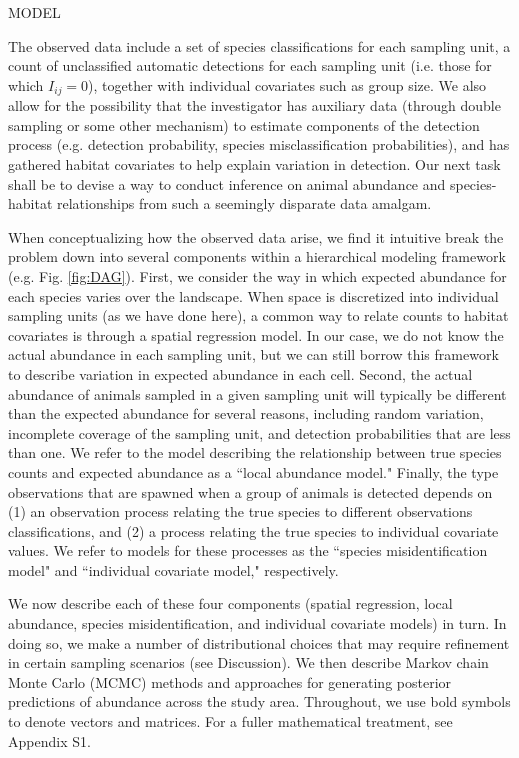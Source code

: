 \documentclass[12pt,fleqn]{article}
\begin{document}
\begin{flushleft}
\vspace{.15in}
MODEL \\
\vspace{.15in}

The observed data include a set of species classifications for each sampling unit, a count of unclassified automatic detections for each sampling unit (i.e. those for which $I_{ij}=0$), together with individual covariates such as group size. We also allow for the possibility that the investigator has auxiliary data (through double sampling or some other mechanism) to estimate components of the detection process (e.g. detection probability, species misclassification probabilities), and has gathered habitat covariates to help explain variation in detection.  Our next task shall be to devise a way to conduct inference on animal abundance and species-habitat relationships from such a seemingly disparate data amalgam.

\hspace{.5in} When conceptualizing how the observed data arise, we find it intuitive break the problem down into several components within a hierarchical modeling framework (e.g. Fig. \ref{fig:DAG}).  First, we consider the way in which expected abundance for each species varies over the landscape.  When space is discretized into individual sampling units (as we have done here), a common way to relate counts to habitat covariates is through a spatial regression model.  In our case, we do not know the actual abundance in each sampling unit, but we can still borrow this framework to describe variation in expected abundance in each cell.  Second, the actual abundance of animals sampled in a given sampling unit will typically be different than the expected abundance for several reasons, including random variation, incomplete coverage of the sampling unit, and detection probabilities that are less than one.  We refer to the model describing the relationship between true species counts and expected abundance as a ``local abundance model."  Finally, the type observations that are spawned when a group of animals is detected depends on (1) an observation process relating the true species to different observations classifications, and (2) a process relating the true species to individual covariate values.  We refer to models for these processes as the ``species misidentification model" and ``individual covariate model," respectively.

\hspace{.5in}We now describe each of these four components (spatial regression, local abundance, species misidentification, and individual covariate models) in turn.  In doing so, we make a number of distributional choices that may require refinement in certain sampling scenarios (see Discussion).  We then describe Markov chain Monte Carlo (MCMC) methods and approaches for generating posterior predictions of abundance across the study area.  Throughout, we use bold symbols to denote vectors and matrices.  For a fuller mathematical treatment, see Appendix S1.



\end{flushleft}
\end{document}
